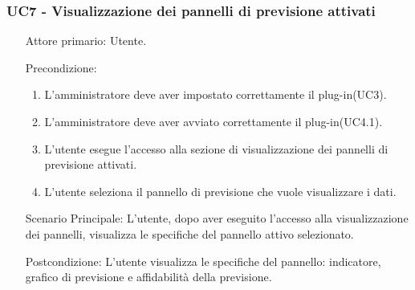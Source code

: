 \subsubsection{UC7 - Visualizzazione dei pannelli di previsione attivati}
\label{sssec:uc7}
\begin{description}
	\begin{enumerate}
		\item[Attore primario:] Utente.
		\item[Precondizione:]
		\begin{enumerate}
			\item L'amministratore deve aver impostato correttamente il plug-in(UC3).
			\item L'amministratore deve aver avviato correttamente il plug-in(UC4.1).
			\item L'utente esegue l'accesso alla sezione di visualizzazione dei pannelli di previsione attivati.
			\item L'utente seleziona il pannello di previsione che vuole visualizzare i dati.
		\end{enumerate}
		\item[Scenario Principale:] L'utente, dopo aver eseguito l'accesso alla visualizzazione dei pannelli, visualizza le specifiche del pannello attivo selezionato.
		\item[Postcondizione:] L'utente visualizza le specifiche del pannello: indicatore, grafico di previsione e affidabilità della previsione.
	\end{enumerate}
\end{description}